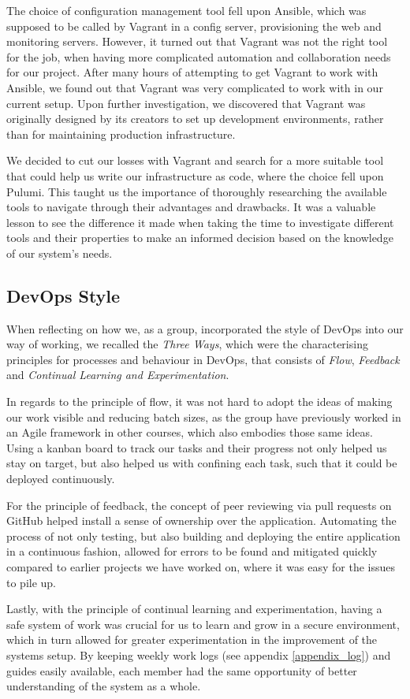 The choice of configuration management tool fell upon Ansible, which was supposed to be called by Vagrant in a config server, provisioning the web and monitoring servers.
However, it turned out that Vagrant was not the right tool for the job, when having more complicated automation and collaboration needs for our project.
After many hours of attempting to get Vagrant to work with Ansible, we found out that Vagrant was very complicated to work with in our current setup\cite{issue178-vagrant-ansible}. Upon further investigation, we discovered that Vagrant was originally designed by its creators to set up development environments, rather than for maintaining production infrastructure\cite{vagrant_vs_terraform}.

We decided to cut our losses with Vagrant and search for a more suitable tool that could help us write our infrastructure as code, where the choice fell upon Pulumi.
This taught us the importance of thoroughly researching the available tools to navigate through their advantages and drawbacks.
It was a valuable lesson to see the difference it made when taking the time to investigate different tools and their properties to make an informed decision based on the knowledge of our system's needs.

\subsection{DevOps Style}
When reflecting on how we, as a group, incorporated the style of DevOps into our way of working, we recalled the \textit{Three Ways}, which were the characterising principles for processes and behaviour in DevOps, that consists of \textit{Flow}, \textit{Feedback} and \textit{Continual Learning and Experimentation}\cite{devopshandbook}.

In regards to the principle of flow, it was not hard to adopt the ideas of making our work visible and reducing batch sizes, as the group have previously worked in an Agile framework in other courses, which also embodies those same ideas. Using a kanban board to track our tasks and their progress not only helped us stay on target, but also helped us with confining each task, such that it could be deployed continuously\cite{devopshandbook}.

For the principle of feedback, the concept of peer reviewing via pull requests on GitHub helped install a sense of ownership over the application. Automating the process of not only testing, but also building and deploying the entire application in a continuous fashion, allowed for errors to be found and mitigated quickly compared to earlier projects we have worked on, where it was easy for the issues to pile up.

Lastly, with the principle of continual learning and experimentation, having a safe system of work\cite{devopshandbook} was crucial for us to learn and grow in a secure environment, which in turn allowed for greater experimentation in the improvement of the systems setup. By keeping weekly work logs (see appendix \ref{appendix_log}) and guides easily available, each member had the same opportunity of better understanding of the system as a whole.
